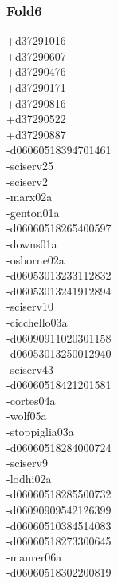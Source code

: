 \begin{multicols}{4}
\subsubsection*{Fold6}
+d37291016\\
+d37290607\\
+d37290476\\
+d37290171\\
+d37290816\\
+d37290522\\
+d37290887\\
-d06060518394701461\\
-sciserv25\\
-sciserv2\\
-marx02a\\
-genton01a\\
-d06060518265400597\\
-downs01a\\
-osborne02a\\
-d06053013233112832\\
-d06053013241912894\\
-sciserv10\\
-cicchello03a\\
-d06090911020301158\\
-d06053013250012940\\
-sciserv43\\
-d06060518421201581\\
-cortes04a\\
-wolf05a\\
-stoppiglia03a\\
-d06060518284000724\\
-sciserv9\\
-lodhi02a\\
-d06060518285500732\\
-d06090909542126399\\
-d06060510384514083\\
-d06060518273300645\\
-maurer06a\\
-d06060518302200819\\

\end{multicols}
